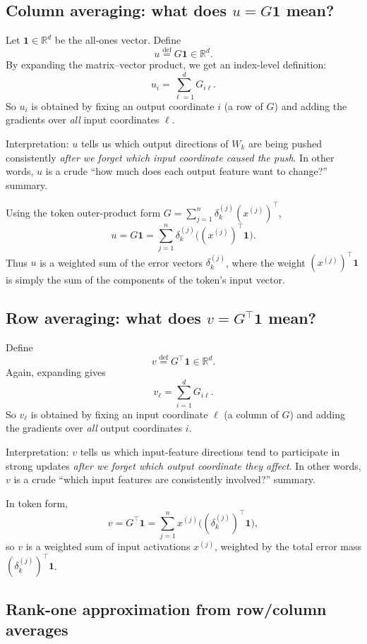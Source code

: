 \documentclass[11pt]{book}
\begin{document}
\subsection{Column averaging: what does $u = G\mathbf{1}$ mean?}

Let $\mathbf{1}\in\mathbb{R}^d$ be the all-ones vector. Define
\[
u \stackrel{\mathrm{def}}{=} G\mathbf{1} \in \mathbb{R}^d.
\]
By expanding the matrix--vector product, we get an index-level definition:
\[
u_i = \sum_{\ell=1}^d G_{i\ell}.
\]
So $u_i$ is obtained by fixing an output coordinate $i$ (a row of $G$) and adding
the gradients over \emph{all} input coordinates $\ell$.

Interpretation: $u$ tells us which output directions of $W_k$ are being pushed
consistently \emph{after we forget which input coordinate caused the push}.
In other words, $u$ is a crude ``how much does each output feature want to change?''
summary.

Using the token outer-product form $G=\sum_{j=1}^n \delta_k^{(j)}(x^{(j)})^\top$,
\[
u = G\mathbf{1}
= \sum_{j=1}^n \delta_k^{(j)} \bigl( (x^{(j)})^\top \mathbf{1} \bigr).
\]
Thus $u$ is a weighted sum of the error vectors $\delta_k^{(j)}$, where the weight
\(
(x^{(j)})^\top \mathbf{1}
\)
is simply the sum of the components of the token's input vector.

\subsection{Row averaging: what does $v = G^\top\mathbf{1}$ mean?}

Define
\[
v \stackrel{\mathrm{def}}{=} G^\top \mathbf{1} \in \mathbb{R}^d.
\]
Again, expanding gives
\[
v_\ell = \sum_{i=1}^d G_{i\ell}.
\]
So $v_\ell$ is obtained by fixing an input coordinate $\ell$ (a column of $G$)
and adding the gradients over \emph{all} output coordinates $i$.

Interpretation: $v$ tells us which input-feature directions tend to participate
in strong updates \emph{after we forget which output coordinate they affect}.
In other words, $v$ is a crude ``which input features are consistently involved?''
summary.

In token form,
\[
v = G^\top\mathbf{1}
= \sum_{j=1}^n x^{(j)} \bigl( (\delta_k^{(j)})^\top \mathbf{1} \bigr),
\]
so $v$ is a weighted sum of input activations $x^{(j)}$, weighted by the total
error mass $(\delta_k^{(j)})^\top\mathbf{1}$.

\subsection{Rank-one approximation from row/column averages}
\end{document}
